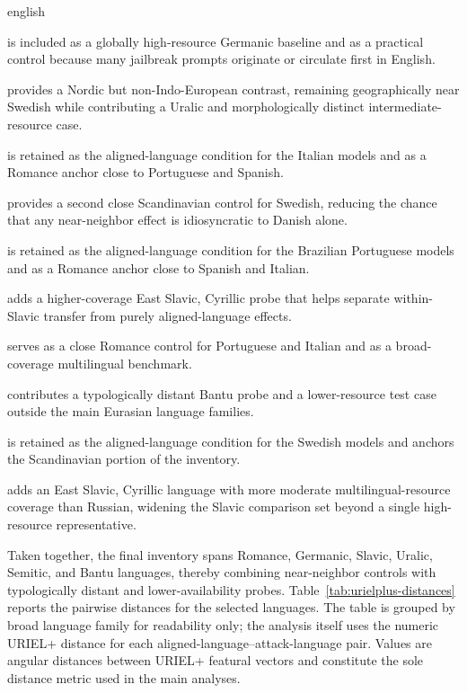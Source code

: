 \begin{otherlanguage*}{english}
\begin{description}[style=multiline,leftmargin=2.2cm,labelwidth=1.6cm,font=\normalfont\ttfamily]
\item[eng] is included as a globally high-resource Germanic baseline and as a practical control because many jailbreak prompts originate or circulate first in English.

\item[fin] provides a Nordic but non-Indo-European contrast, remaining geographically near Swedish while contributing a Uralic and morphologically distinct intermediate-resource case.

\item[ita] is retained as the aligned-language condition for the Italian models and as a Romance anchor close to Portuguese and Spanish.

\item[nor] provides a second close Scandinavian control for Swedish, reducing the chance that any near-neighbor effect is idiosyncratic to Danish alone.

\item[por] is retained as the aligned-language condition for the Brazilian Portuguese models and as a Romance anchor close to Spanish and Italian.

\item[rus] adds a higher-coverage East Slavic, Cyrillic probe that helps separate within-Slavic transfer from purely aligned-language effects.

\item[spa] serves as a close Romance control for Portuguese and Italian and as a broad-coverage multilingual benchmark.

\item[swa] contributes a typologically distant Bantu probe and a lower-resource test case outside the main Eurasian language families.

\item[swe] is retained as the aligned-language condition for the Swedish models and anchors the Scandinavian portion of the inventory.

\item[ukr] adds an East Slavic, Cyrillic language with more moderate multilingual-resource coverage than Russian, widening the Slavic comparison set beyond a single high-resource representative.

\end{description}

Taken together, the final inventory spans Romance, Germanic, Slavic, Uralic, Semitic, and Bantu languages, thereby combining near-neighbor controls with typologically distant and lower-availability probes. Table~\ref{tab:urielplus-distances} reports the pairwise distances for the selected languages. The table is grouped by broad language family for readability only; the analysis itself uses the numeric URIEL+ distance for each aligned-language--attack-language pair. Values are angular distances between URIEL+ featural vectors and constitute the sole distance metric used in the main analyses.


\end{otherlanguage*}
